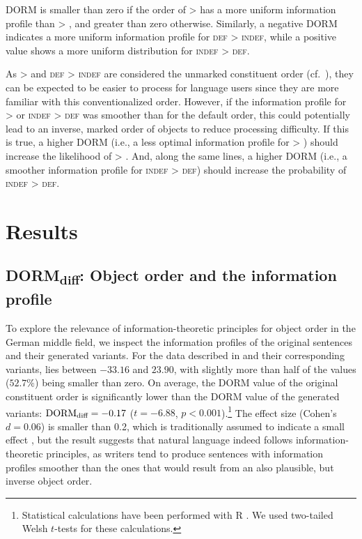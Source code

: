 \documentclass[output=paper,colorlinks,citecolor=brown]{langscibook}
\begin{document}
 \textnormal{DORM} is smaller than zero if the order of \ReichDat{} > \ReichAcc{} has a more uniform information profile than \ReichAcc{} > \ReichDat{}, and greater than zero otherwise. Similarly, a negative \textnormal{DORM} indicates a more uniform information profile for \textsc{def > indef}, while a positive value shows a more uniform distribution for \textsc{indef > def}.

As \ReichDat{} > \ReichAcc{} and \textsc{def > indef} are considered the unmarked constituent order (cf.\ ), they can be expected to be easier to process for language users since they are more familiar with this conventionalized order.
However, if the information profile for \ReichAcc{} > \ReichDat{} or \textsc{indef} > \textsc{def} was smoother than for the default order, this could potentially lead to an inverse, marked order of objects to reduce processing difficulty. If this is true, a higher  \textnormal{DORM} (i.e., a less optimal information profile for \ReichDat{} > \ReichAcc{}) should increase the likelihood of \ReichAcc{} > \ReichDat{}. And, along the same lines, a higher \textnormal{DORM}  (i.e., a smoother information profile for \textsc{indef > def}) should increase the probability of \textsc{indef > def}.

\section{Results}\label{sec:results}

\subsection{DORM\textsubscript{diff}: Object order and the information profile}\label{subsec:results_Dormdiff}

To explore the relevance of information-theoretic principles for object order in the German middle field, we inspect the information profiles of the original sentences and their generated variants.
For the data described in  and their corresponding variants, \DDIFF lies between $-33.16$ and $23.90$, with slightly more than half of the values ($52.7\%$) being smaller than zero. On average, the DORM value of the original constituent order is significantly lower than the DORM value of the generated variants: $\textnormal{DORM}\textsubscript{diff} = -0.17$ ($t=-6.88$, $p<0.001$).\footnote{Statistical calculations have been performed with R \citep{R}. We used two-tailed Welsh $t$-tests for these calculations.} The effect size (Cohen's $d = 0.06$) is smaller than 0.2, which is traditionally assumed to indicate a small effect \citep{Winter.2020}, but the result suggests that natural language indeed follows information-theoretic principles, as writers tend to produce sentences with information profiles smoother than the ones that would result from an also plausible, but inverse object order.
\end{document}
